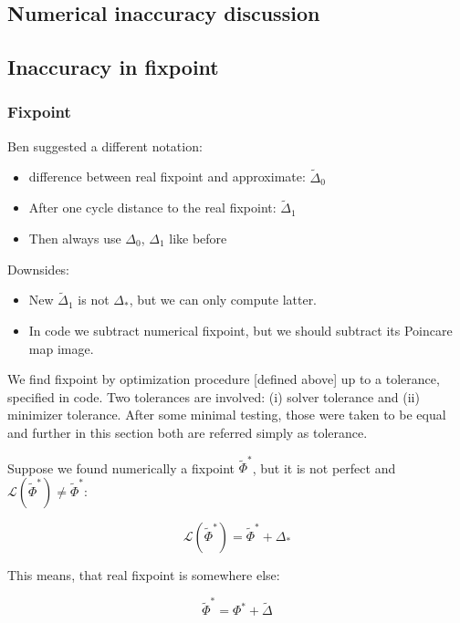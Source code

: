 \documentclass[a4paper,12pt]{article}
\newcommand*{\wt}{\widetilde} %
\newcommand*{\FP}{\Phi^*}%
\newcommand*{\D}{\Delta}%
\begin{document}
\begin{appendices}
\section{Numerical inaccuracy discussion}


\subsection{Inaccuracy in fixpoint}

\subsubsection{Fixpoint}


\begin{itshape}
{\small 
Ben suggested a different notation:
\begin{itemize}
\item  difference between real fixpoint and approximate: $\wt \D_0$
\item  After one cycle distance to the real fixpoint: $\wt \D_1$
\item Then always use $\D_0$, $\D_1$ like before

\end{itemize}
Downsides:

\begin{itemize}
\item New $\wt \D_1$ is not $\D_*$, but we can only compute latter.
\item In code we subtract numerical fixpoint, but we should  subtract its Poincare map image.
\end{itemize}

}
\end{itshape}

We find fixpoint by optimization procedure [defined above] up to a tolerance, specified in code. Two tolerances are involved: (i) solver tolerance and (ii) minimizer tolerance. After some minimal testing, those were taken to be equal and further in this section both are referred simply as tolerance.

Suppose we found numerically a fixpoint $\wt \Phi^*$, but it is not perfect and $ \mathcal{L}(\wt \FP) \neq \wt \FP $:

$$ \mathcal{L}(\wt \FP) = \wt \FP + \D_*$$

This means, that real fixpoint is somewhere else:

$$\wt \FP= \FP + \wt{\D}$$


\end{appendices}
\end{document}
